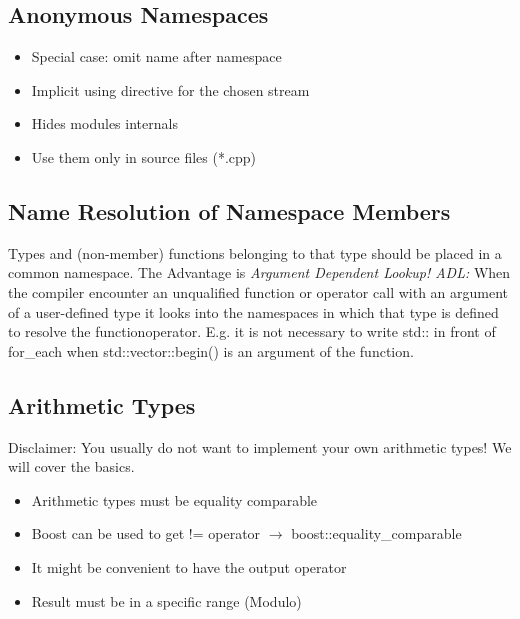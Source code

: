 \subsection{Anonymous Namespaces}
\begin{itemize}
  \itemsep -0.5em 
  \item Special case: omit name after namespace
  \item Implicit using directive for the chosen stream
  \item Hides modules internals
  \item Use them only in source files (*.cpp)
\end{itemize}


\subsection{Name Resolution of Namespace Members}
Types and (non-member) functions belonging to that type should be placed in a common namespace. The Advantage is \textit{Argument Dependent Lookup! ADL:} When the compiler encounter an unqualified function or operator call with an argument of a user-defined type it looks into the namespaces in which that type is defined to resolve the function\/operator. E.g. it is not necessary to write std:: in front of for\_each when std::vector::begin() is an argument of the function.



\subsection{Arithmetic Types}
Disclaimer: You usually do not want to implement your own arithmetic types! We will cover the basics.

\begin{itemize}
	\itemsep -0.5em
    \item Arithmetic types must be equality comparable
    \item Boost can be used to get != operator $\rightarrow$ boost::equality\_comparable
    \item It might be convenient to have the output operator
    \item Result must be in a specific range (Modulo)
\end{itemize}
\pagebreak